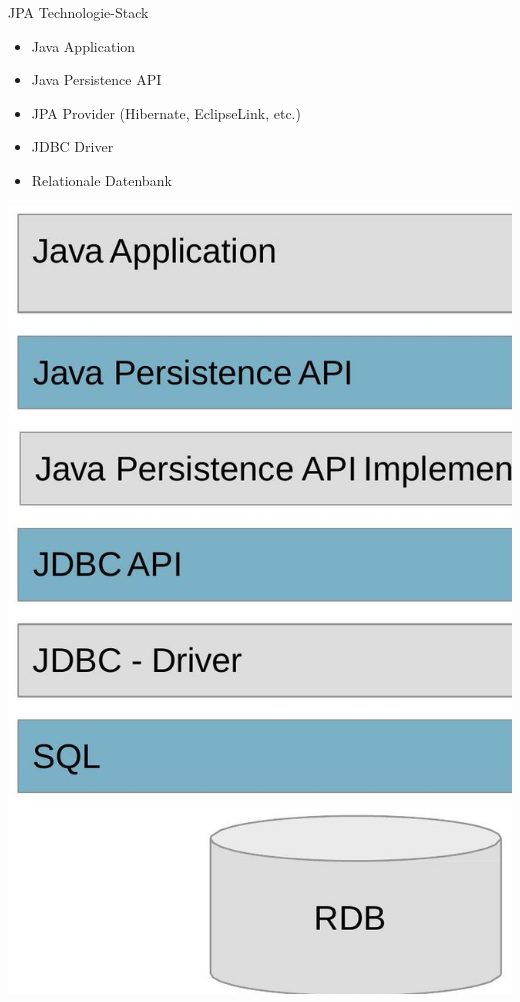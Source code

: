 \begin{concept}{JPA Technologie-Stack}\\
\begin{itemize}
    \item Java Application
    \item Java Persistence API
    \item JPA Provider (Hibernate, EclipseLink, etc.)
    \item JDBC Driver
    \item Relationale Datenbank
\end{itemize}
\includegraphics[width=0.8\linewidth]{images/2025_01_02_5ba1dc702e9f94ba8e06g-29.jpg}
\end{concept}


